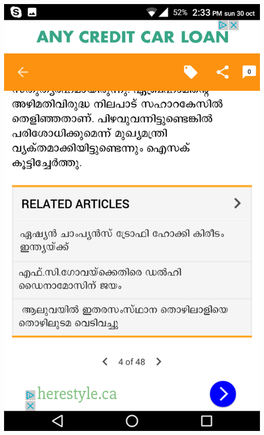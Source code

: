 \documentclass[a4paper, 11pt]{article}
\begin{document}
\includegraphics[scale=0.15]{sg.png}
\end{document}
